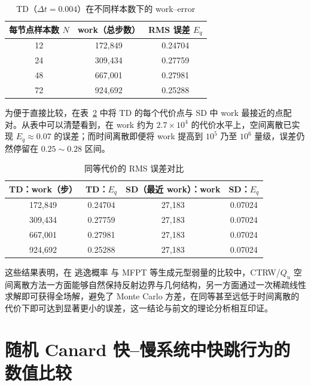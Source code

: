 \begin{table}[htbp]
	\centering
	\caption{TD（\(\Delta t=0.004\)）在不同样本数下的 work--error}
	\label{tab:td-committor}
	\begin{tabular}{ccc}
		\toprule
		每节点样本数 \(N\) & work（总步数） & RMS 误差 \(E_q\) \\
		\midrule
		12 & 172{,}849 & 0.24704 \\
		24 & 309{,}434 & 0.27759 \\
		48 & 667{,}001 & 0.27981 \\
		72 & 924{,}692 & 0.25288 \\
		\bottomrule
	\end{tabular}
\end{table}

为便于直接比较，在表~\ref{tab:equal-work-committor} 中将 TD 的每个代价点与 SD 中 work 最接近的点配对。从表中可以清楚看到，在 work 约为 \(2.7\times 10^4\) 的代价水平上，空间离散已实现 \(E_q\approx 0.07\) 的误差；而时间离散即便将 work 提高到 \(10^5\) 乃至 \(10^6\) 量级，误差仍然停留在 \(0.25\sim 0.28\) 区间。

\begin{table}[htbp]
	\centering
	\caption{同等代价的 RMS 误差对比}
	\label{tab:equal-work-committor}
	\begin{tabular}{cccc}
		\toprule
		TD：work（步） & TD：\(E_q\) & SD（最近 work）：work & SD：\(E_q\) \\
		\midrule
		172{,}849 & 0.24704 & 27{,}183 & 0.07024 \\
		309{,}434 & 0.27759 & 27{,}183 & 0.07024 \\
		667{,}001 & 0.27981 & 27{,}183 & 0.07024 \\
		924{,}692 & 0.25288 & 27{,}183 & 0.07024 \\
		\bottomrule
	\end{tabular}
\end{table}

这些结果表明，在 逃逸概率 与 MFPT 等生成元型弱量的比较中，CTRW/\(Q_u\) 空间离散方法一方面能够自然保持反射边界与几何结构，另一方面通过一次稀疏线性求解即可获得全场解，避免了 Monte Carlo 方差，在同等甚至远低于时间离散的代价下即可达到显著更小的误差，这一结论与前文的理论分析相互印证。

\newpage



\section{随机 Canard 快--慢系统中快跳行为的数值比较}
\label{sec:canard-fast-jump}

